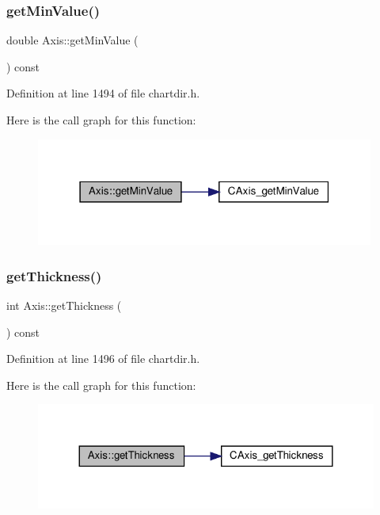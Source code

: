 \subsubsection{\texorpdfstring{get\+Min\+Value()}{getMinValue()}}
{\footnotesize\ttfamily double Axis\+::get\+Min\+Value (\begin{DoxyParamCaption}{ }\end{DoxyParamCaption}) const\hspace{0.3cm}{\ttfamily [inline]}}



Definition at line 1494 of file chartdir.\+h.

Here is the call graph for this function\+:
\nopagebreak
\begin{figure}[H]
\begin{center}
\leavevmode
\includegraphics[width=315pt]{class_axis_a2a1c7c42965a0689314845e17ac8606d_cgraph}
\end{center}
\end{figure}
\mbox{\label{class_axis_a11de5c65bb39d2ad0f00def9adc9fec1}} 
\subsubsection{\texorpdfstring{get\+Thickness()}{getThickness()}}
{\footnotesize\ttfamily int Axis\+::get\+Thickness (\begin{DoxyParamCaption}{ }\end{DoxyParamCaption}) const\hspace{0.3cm}{\ttfamily [inline]}}



Definition at line 1496 of file chartdir.\+h.

Here is the call graph for this function\+:
\nopagebreak
\begin{figure}[H]
\begin{center}
\leavevmode
\includegraphics[width=324pt]{class_axis_a11de5c65bb39d2ad0f00def9adc9fec1_cgraph}
\end{center}
\end{figure}
\mbox{\label{class_axis_a32d922936b68fc6b201dbe6faa08c905}} 
